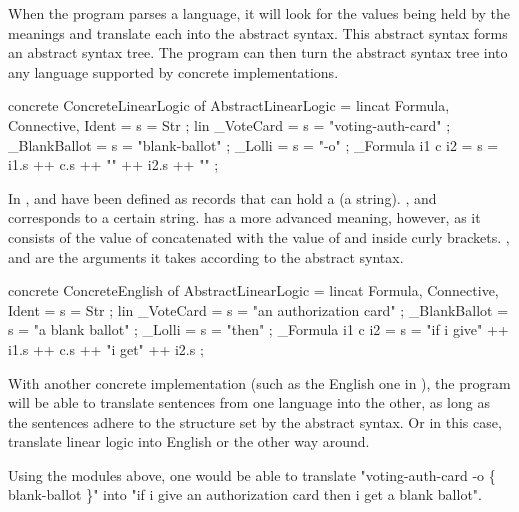 When the program parses a language, it will look for the values being held by the meanings and translate each into the abstract syntax. This abstract syntax forms an abstract syntax tree. The program can then turn the abstract syntax tree into any language supported by concrete implementations.

\begin{lstgf}
concrete ConcreteLinearLogic of AbstractLinearLogic = {
    lincat 
        Formula, Connective, Ident = {s = Str} ;
    lin 
        _VoteCard = {s = "voting-auth-card"} ;
        _BlankBallot = {s = "blank-ballot"} ;
        _Lolli = {s = "-o"} ;
        _Formula i1 c i2 = {s = i1.s ++ c.s ++ "{" ++ i2.s ++ "}"} ;
}
\end{lstgf}

In  ,  and  have been defined as records that can hold a  (a string). ,  and  corresponds to a certain string. 
 has a more advanced meaning, however, as it consists of the value of  concatenated with the value of  and  inside curly brackets. ,  and  are the arguments it takes according to the abstract syntax.

\begin{lstgf}
concrete ConcreteEnglish of AbstractLinearLogic = {
    lincat 
        Formula, Connective, Ident = {s = Str} ;
    lin 
        _VoteCard = {s = "an authorization card"} ;
        _BlankBallot = {s = "a blank ballot"} ;
        _Lolli = {s = "then"} ;
        _Formula i1 c i2 = {s = "if i give" ++ i1.s ++ c.s ++ "i get" ++ i2.s} ;
}
\end{lstgf}

With another concrete implementation (such as the English one in ), the program will be able to translate sentences from one language into the other, as long as the sentences adhere to the structure set by the abstract syntax. Or in this case, translate linear logic into English or the other way around.

Using the modules above, one would be able to translate "voting-auth-card -o \{ blank-ballot \}" into "if i give an authorization card then i get a blank ballot".

